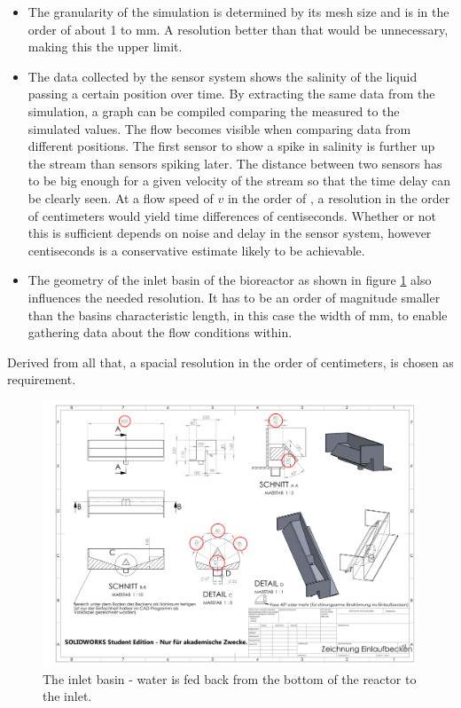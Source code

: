 \begin{itemize}
\item The granularity of the simulation is determined by its mesh size and is in the order of about 1 to \unit[5]{mm}. A resolution better than that would be unnecessary, making this the upper limit.

\item The data collected by the sensor system shows the salinity of the liquid passing a certain position over time. By extracting the same data from the simulation, a graph can be compiled comparing the measured to the simulated values. The flow becomes visible when comparing data from different positions. The first sensor to show a spike in salinity is further up the stream than sensors spiking later. The distance between two sensors has to be big enough for a given velocity of the stream so that the time delay can be clearly seen. At a flow speed of $ v $ in the order of , a resolution in the order of centimeters would yield time differences of centiseconds. Whether or not this is sufficient depends on noise and delay in the sensor system, however centiseconds is a conservative estimate likely to be achievable.

\item The geometry of the inlet basin of the bioreactor as shown in figure \ref{fig:elb} also influences the needed resolution. It has to be an order of magnitude smaller than the basins characteristic length, in this case the width of \unit[850]{mm}, to enable gathering data about the flow conditions within.
\end{itemize}

Derived from all that, a spacial resolution in the order of centimeters, is chosen as requirement.

\begin{figure}
	\begin{center}
		\includegraphics[width=\textwidth]{images/Einlaufbecken.pdf} 
		\caption[The inlet basin]{The inlet basin - water is fed back from the bottom of the reactor to the inlet.}
		\label{fig:elb}
	\end{center}
\end{figure}

